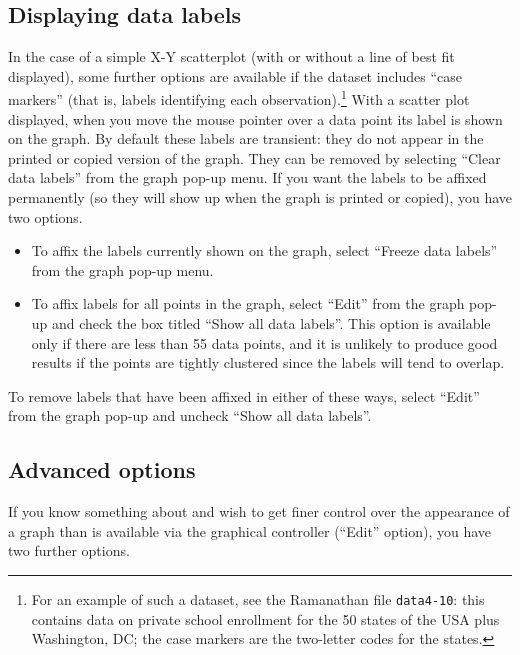 \subsection{Displaying data labels}
\label{plot-labels}

In the case of a simple X-Y scatterplot (with or without a line of
best fit displayed), some further options are available if the dataset
includes ``case markers'' (that is, labels identifying each
observation).\footnote{For an example of such a dataset, see the
  Ramanathan file \verb+data4-10+: this contains data on private
  school enrollment for the 50 states of the USA plus Washington, DC;
  the case markers are the two-letter codes for the states.} With a
scatter plot displayed, when you move the mouse pointer over a data
point its label is shown on the graph.  By default these labels are
transient: they do not appear in the printed or copied version of the
graph.  They can be removed by selecting ``Clear data labels'' from
the graph pop-up menu. If you want the labels to be affixed
permanently (so they will show up when the graph is printed or
copied), you have two options.
    
\begin{itemize}
\item To affix the labels currently shown on the graph, select
  ``Freeze data labels'' from the graph pop-up menu.
\item To affix labels for all points in the graph, select ``Edit''
  from the graph pop-up and check the box titled ``Show all data
  labels''.  This option is available only if there are less than 55
  data points, and it is unlikely to produce good results if the
  points are tightly clustered since the labels will tend to overlap.
\end{itemize}


To remove labels that have been affixed in either of these ways,
select ``Edit'' from the graph pop-up and uncheck ``Show all data
labels''.
    

\subsection{Advanced options}
\label{plot-advanced}

If you know something about  and wish to get finer
control over the appearance of a graph than is available via the
graphical controller (``Edit'' option), you have two further options.

